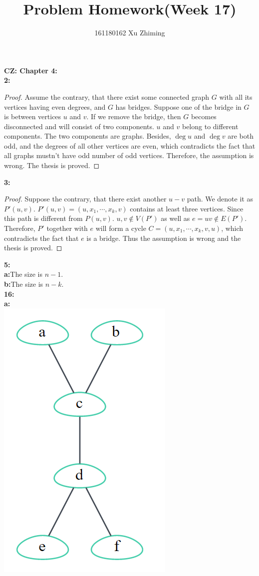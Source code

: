 \documentclass{article}
\begin{document}
\title{Problem Homework(Week 17)}\author{161180162 Xu Zhiming}\maketitle
\large\textbf{CZ: Chapter 4:}\\
\normalsize\textbf{2:}
\begin{proof}
Assume the contrary, that there exist some connected graph $G$ with all its vertices having even degrees, and $G$ has bridges. Suppose one of the bridge in $G$ is between vertices $u$ and $v$. If we remove the bridge, then $G$ becomes disconnected and will consist of two components. $u$ and $v$ belong to different components. The two components are graphs. Besides, $\deg u$ and $\deg v$ are both odd, and the degrees of all other vertices are even, which contradicts the fact that all graphs mustn't have odd number of odd vertices. Therefore, the assumption  is wrong. The thesis is proved.
\end{proof}
\textbf{3:}
\begin{proof}
Suppose the contrary, that there exist another $u-v$ path. We denote it as $P'(u,v)$. $P'(u,v)=(u,x_1,\cdots,x_k,v)$ contains at least three vertices. Since this path is different from $P(u,v)$. $u,v\notin V(P')$ as well as $e=uv\notin E(P')$. Therefore, $P'$ together with $e$ will form a cycle $C=(u,x_1,\cdots,x_k,v,u)$, which contradicts the fact that $e$ is a bridge. Thus the assumption is wrong and the thesis is proved.
\end{proof}
\textbf{5:}\\
\textbf{a:}The size is $n-1$.\\
\textbf{b:}The size is $n-k$.\\
\textbf{16:}\\
\textbf{a:}\\
\includegraphics[scale=0.2]{17_1.png}
\end{document}
